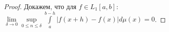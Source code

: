 \begin{proof}
	Докажем, что для $f\in L_1[a,b]$: $\lim\limits_{\delta\to 0}\sup\limits_{0\leqslant n\leqslant \delta}\int\limits_{a}^{b-h}|f(x+h)-f(x)|d\mu(x)=0$.
\end{proof}
















































